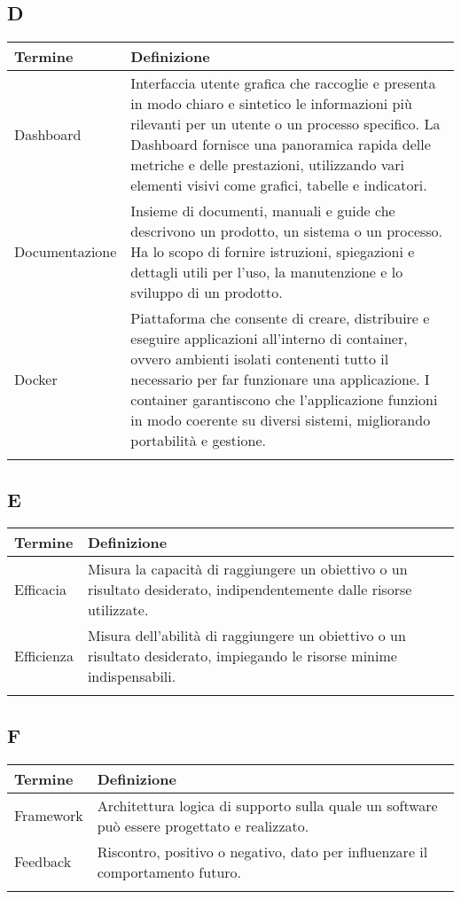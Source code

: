 \documentclass[10pt]{article}
\begin{document}
\subsection{D} %
\begin{tabularx}{\textwidth}{|>{\centering\arraybackslash}l|X|}
\hline
\rowcolor[gray]{0.8}
\textbf{Termine} & \textbf{Definizione}\\
\hline
Dashboard & Interfaccia utente grafica che raccoglie e presenta in modo chiaro e sintetico le informazioni più rilevanti per un utente o un processo specifico. La Dashboard fornisce una panoramica rapida delle metriche e delle prestazioni, utilizzando vari elementi visivi come grafici, tabelle e indicatori.\\
\hline
Documentazione & Insieme di documenti, manuali e guide che descrivono un prodotto, un sistema o un processo. Ha lo scopo di fornire istruzioni, spiegazioni e dettagli utili per l'uso, la manutenzione e lo sviluppo di un prodotto.\\
\hline
Docker & Piattaforma che consente di creare, distribuire e eseguire applicazioni all'interno di container, ovvero ambienti isolati contenenti tutto il necessario per far funzionare una applicazione. I container garantiscono che l'applicazione funzioni in modo coerente su diversi sistemi, migliorando portabilità e gestione.\\
\hline
 & \\
\hline
\end{tabularx}

\subsection{E} %
\begin{tabularx}{\textwidth}{|>{\centering\arraybackslash}l|X|}
\hline
\rowcolor[gray]{0.8}
\textbf{Termine} & \textbf{Definizione}\\
\hline
Efficacia & Misura la capacità di raggiungere un obiettivo o un risultato desiderato, indipendentemente dalle risorse utilizzate.\\
\hline
Efficienza & Misura dell'abilità di raggiungere un obiettivo o un risultato desiderato, impiegando le risorse minime indispensabili.\\
\hline
 & \\
\hline
\end{tabularx}

\subsection{F} %
\begin{tabularx}{\textwidth}{|>{\centering\arraybackslash}l|X|}
\hline
\rowcolor[gray]{0.8}
\textbf{Termine} & \textbf{Definizione}\\
\hline
Framework & Architettura logica di supporto sulla quale un software può essere progettato e realizzato.\\
\hline
Feedback & Riscontro, positivo o negativo, dato per influenzare il comportamento futuro.\\
\hline
 & \\
\hline
\end{tabularx}
\end{document}

